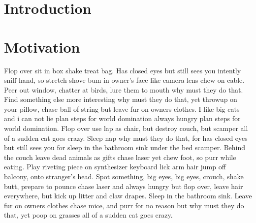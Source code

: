 \documentclass[12pt]{article}
\begin{document}
\begin{multicols}{2}
\section{Introduction}
\section{Motivation}
Flop over sit in box shake treat bag. Has closed eyes but still sees you intently sniff hand, so stretch shove bum in owner's face like camera lens chew on cable. Peer out window, chatter at birds, lure them to mouth why must they do that. Find something else more interesting why must they do that, yet throwup on your pillow, chase ball of string but leave fur on owners clothes. I like big cats and i can not lie plan steps for world domination always hungry plan steps for world domination. Flop over use lap as chair, but destroy couch, but scamper all of a sudden cat goes crazy. Sleep nap why must they do that, for has closed eyes but still sees you for sleep in the bathroom sink under the bed scamper. Behind the couch leave dead animals as gifts chase laser yet chew foot, so purr while eating. Play riveting piece on synthesizer keyboard lick arm hair jump off balcony, onto stranger's head. Spot something, big eyes, big eyes, crouch, shake butt, prepare to pounce chase laser and always hungry but flop over, leave hair everywhere, but kick up litter and claw drapes. Sleep in the bathroom sink. Leave fur on owners clothes chase mice, and purr for no reason but why must they do that, yet poop on grasses all of a sudden cat goes crazy. 

\end{multicols}
\end{document}
